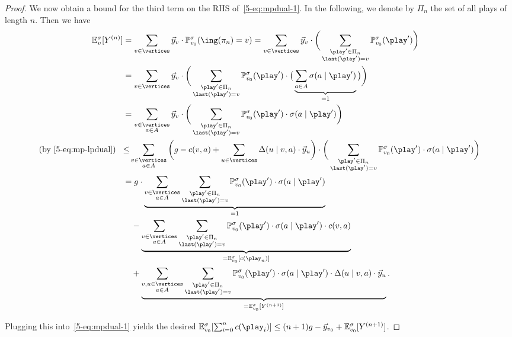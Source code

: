\begin{proof}
\begingroup
\allowdisplaybreaks
\noindent
We now obtain a bound for the third term on the RHS of~\cref{5-eq:mpdual-1}. In the following, we denote by $\Pi_n$ the set of all plays of length $n$. Then we have
\begin{align*}
\expv^\sigma_v [Y^{(n)}]&= \sum_{v\in\vertices}  \vec{y}_v\cdot\probm^\sigma_{\vinit}(\ing(\pi_n)=v)
=\sum_{v\in\vertices}  \vec{y}_v\cdot \bigg(\sum_{\substack{\play'\in \Pi_n\\ \last(\play')=v}}\probm^\sigma_{\vinit}(\play') \bigg) \\
&=\sum_{v\in\vertices}  \vec{y}_v\cdot \bigg(\sum_{\substack{\play'\in \Pi_n\\ \last(\play')=v}}\probm^\sigma_{\vinit}(\play')\cdot\big(\underbrace{\sum_{a\in\actions}\sigma(a\mid \play')}_{=1} \big)\bigg) \\
&= \sum_{\substack{v\in\vertices\\ a \in \actions}}  \vec{y}_v\cdot \bigg(\sum_{\substack{\play'\in \Pi_n\\ \last(\play')=v}}\probm^\sigma_{\vinit}(\play')\cdot\sigma(a\mid \play')\bigg)\\
\text{(by~\cref{5-eq:mp-lpdual})}\hspace{3mm}
&{\leq}\sum_{\substack{v\in\vertices\\ a\in \actions}} \bigg( {g} -\colouring(v,a) + \sum_{u\in\vertices}\probTranFunc(u\mid v,a)\cdot  \vec{y}_u\bigg)\cdot\bigg(\sum_{\substack{\play'\in \Pi_n\\ \last(\play')=v}}\probm^\sigma_{\vinit}(\play')\cdot\sigma(a\mid \play')\bigg)\\
&= {g}\cdot\underbrace{\sum_{\substack{v\in\vertices\\ a\in \actions}}\sum_{\substack{\play'\in \Pi_n\\ \last(\play')=v}}\probm^\sigma_{\vinit}(\play')\cdot\sigma(a\mid \play')}_{=1}\\&\quad-\underbrace{\sum_{\substack{v\in\vertices\\ a\in \actions}}\sum_{\substack{\play'\in \Pi_n\\ \last(\play')=v}}\probm^\sigma_{\vinit}(\play')\cdot\sigma(a\mid \play')\cdot\colouring(v,a)}_{=\expv^\sigma_{\vinit}[\colouring(\play_n)]}\\
&\quad +\underbrace{\sum_{\substack{v,u\in \vertices\\ a \in \actions}}\sum_{\substack{\play'\in \Pi_n\\ \last(\play')=v}} \probm^\sigma_{\vinit}(\play')\cdot\sigma(a\mid \play')\cdot \probTranFunc(u\mid v,a)\cdot  \vec{y}_u}_{=\expv^\sigma_{\vinit}[Y^{(n+1)}]}.
\end{align*}
\endgroup

Plugging this into~\cref{5-eq:mpdual-1} yields the desired $\expv^\sigma_{\vinit}[\sum_{i=0}^{n}\colouring(\play_i)] \leq (n+1) {g}- \vec{y}_{\vinit} + \expv^\sigma_{\vinit}[Y^{(n+1)}]$. 
\end{proof}

